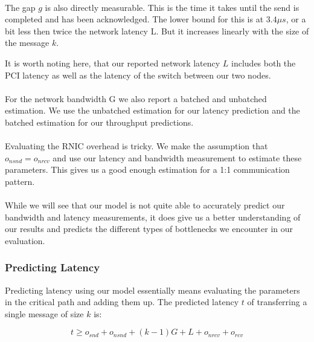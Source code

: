\paragraph{} The gap $g$ is also directly measurable. This is the time it takes until the send is completed and has been
acknowledged. The lower bound for this is at $3.4\mu s$, or a bit less then twice the network latency L. But it increases
linearly with the size of the message $k$.

It is worth noting here, that our reported network latency $L$ includes both the PCI latency as well as the latency
of the switch between our two nodes.

\paragraph{} For the network bandwidth G we also report a batched and unbatched estimation. We use the unbatched estimation
for our latency prediction and the batched estimation for our throughput predictions.

\paragraph{} Evaluating the RNIC overhead is tricky. We make the assumption that $o_{nsnd} = o_{nrcv}$ and use our latency
and bandwidth measurement to estimate these parameters. This gives us a good enough estimation for a 1:1 communication pattern.




\paragraph{} While we will see that our model is not quite able to accurately predict our bandwidth and latency 
measurements, it does  give us a better understanding of our results and predicts the different types of bottlenecks 
we encounter in our evaluation.

\subsubsection{Predicting Latency}

Predicting latency using our model essentially means evaluating the parameters in the critical path and adding them up. 
The predicted latency $t$ of transferring a single message of size $k$ is:

$$
t \geq o_{snd} + o_{nsnd}  + (k-1)G + L + o_{nrcv} + o_{rcv}
$$



